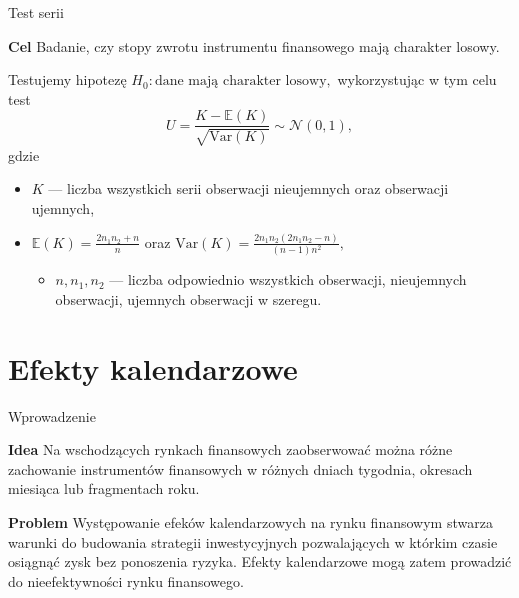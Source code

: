 \documentclass[a4paper, 11pt]{beamer}
\begin{document}
	\begin{frame}{Test serii}
		\begin{block}{\textbf{Cel}}
			Badanie, czy stopy zwrotu instrumentu finansowego mają charakter
			losowy.
		\end{block}
		Testujemy hipotezę $H_{0}: \mbox{dane mają charakter losowy},$ 
		wykorzystując w tym celu test \[
			U=\frac{K-\mathbb{E}\left(K\right)}{\sqrt{\mbox{Var}\left(K\right)}} \sim \mathcal{N}\left(0,1\right),
		\] gdzie
		\begin{itemize}
			\item $K$ --- liczba wszystkich serii obserwacji nieujemnych oraz obserwacji ujemnych,
			\item $\mathbb{E}\left(K\right) = \frac{2 n_1 n_2 + n}{n}$ oraz
				$\mbox{Var}\left(K\right) = \frac{2 n_1 n_2 \left(2 n_1 n_2 - n\right)}{\left(n - 1\right) n^2},$
			\begin{itemize}
				\item $n, n_1, n_2$ --- liczba odpowiednio wszystkich obserwacji, nieujemnych obserwacji, ujemnych obserwacji w szeregu.
			\end{itemize}
		\end{itemize}
	\end{frame}
	
	\section{Efekty kalendarzowe}
	
	\begin{frame}{Wprowadzenie}
		\begin{block}{\textbf{Idea}}
			Na wschodzących rynkach finansowych zaobserwować można różne 
			zachowanie instrumentów finansowych w różnych dniach tygodnia, okresach
			miesiąca lub fragmentach roku.
		\end{block}
		\begin{block}{\textbf{Problem}}
			Występowanie efeków kalendarzowych na rynku finansowym stwarza warunki 
			do budowania strategii inwestycyjnych pozwalających w którkim czasie 
			osiągnąć zysk bez ponoszenia ryzyka. Efekty kalendarzowe mogą zatem
			prowadzić do nieefektywności rynku finansowego.
		\end{block}
	\end{frame}
	
\end{document}
